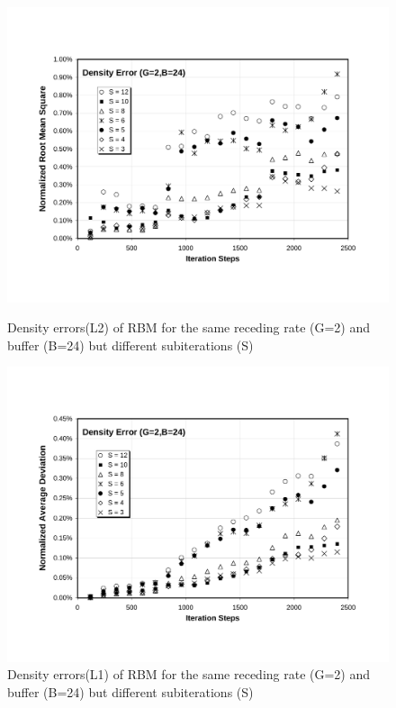 \cp



\begin{figure}[htbp]
  \begin{center}
\includegraphics[scale=0.6]{../figures/Exp3-CASE1-dt0.005/G_2_B_24/G2-B24-Den-NRMS.pdf}
    \caption{Density errors(L2) of RBM for the same receding rate (G=2) and buffer (B=24) but different subiterations (S)}
    \label{fig:RBM-GC-den-error-G2-B24}

        \vspace{0.5in}
\includegraphics[scale=0.6]{../figures/Exp3-CASE1-dt0.005/G_2_B_24/G2-B24-Den-NAD.pdf}
    \caption{Density errors(L1) of RBM for the same receding rate (G=2) and buffer (B=24) but different subiterations (S)}
  \end{center}
\end{figure}

